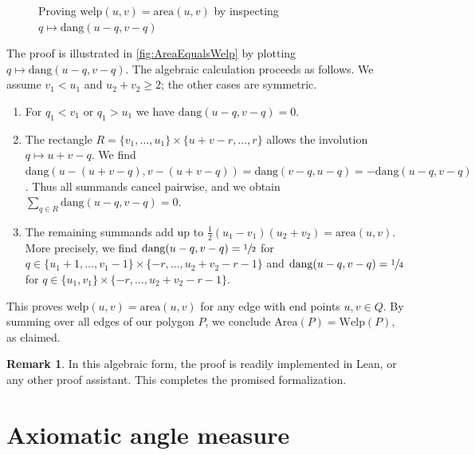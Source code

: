 \documentclass[a4paper]{amsart}
\numberwithin{equation}{section}
\theoremstyle{plain}
\theoremstyle{definition}
\newtheorem{remark}[theorem]{Remark}
\newcommand{\area}{\mathrm{area}}
\newcommand{\Area}{\mathrm{Area}}
\newcommand{\dang}{\mathrm{dang}}
\newcommand{\welp}{\mathrm{welp}}
\newcommand{\Welp}{\mathrm{Welp}}
\begin{document}
\begin{figure}[ht]
  \caption{Proving $\welp(u,v) = \area(u,v)$ by inspecting $q \mapsto \dang(u-q,v-q)$}
  \label{fig:AreaEqualsWelp}
\end{figure}


The proof is illustrated in \autoref{fig:AreaEqualsWelp}
by plotting $q \mapsto \dang(u-q,v-q)$.
The algebraic calculation proceeds as follows.
We assume $v_1 < u_1$ and $u_2 + v_2 \ge 2$;
the other cases are symmetric.
\begin{enumerate}
\item
  For $q_1 < v_1$ or $q_1 > u_1$ we have $\dang(u-q,v-q) = 0$.
\item
  The rectangle $R = \{v_1,\ldots,u_1\} \times \{u+v-r,\ldots,r\}$
  allows the involution $q \mapsto u+v-q$.
  We find $\dang(u-(u+v-q), v-(u+v-q)) = \dang(v-q,u-q) = -\dang(u-q,v-q)$.
  Thus all summands cancel pairwise,
  and we obtain $\sum_{q \in R} \dang(u-q,v-q) = 0$.
\item
  The remaining summands add up to $\frac{1}{2} (u_1-v_1) (u_2+v_2) = \area(u,v)$.
  More precisely, we find $\dang(u-q,v-q) = \sfrac{1}{2}$
  for $q \in \{u_1+1,\ldots,v_1-1\} \times \{-r,\ldots,u_2+v_2-r-1\}$
  and $\dang(u-q,v-q) = \sfrac{1}{4}$
  for $q \in \{u_1,v_1\} \times \{-r,\ldots,u_2+v_2-r-1\}$.
\end{enumerate}

This proves $\welp(u,v) = \area(u,v)$
for any edge with end points $u,v \in Q$.
By summing over all edges of our polygon $P$,
we conclude $\Area(P) = \Welp(P)$, as claimed. %


\begin{remark}
  In this algebraic form, the proof is readily implemented in Lean,
  or any other proof assistant.  This completes the promised formalization.
\end{remark}


\appendix

\setcounter{section}{0}
\section{Axiomatic angle measure}
\end{document}
